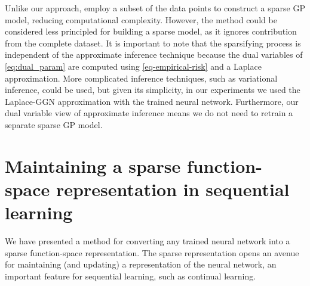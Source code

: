 \documentclass{article}
\begin{document}
Unlike our approach, \citet{immer2021improving} employ a subset of the data points to construct a sparse GP model, reducing computational complexity. However, the method could be considered less principled for building a sparse model, as it ignores contribution from the complete dataset. It is important to note that the sparsifying process is independent of the approximate inference technique because the dual variables of \cref{eq:dual_param} are computed using \cref{eq-empirical-risk} and a Laplace approximation. More complicated inference techniques, such as variational inference, could be used, but given its simplicity, in our experiments we used the Laplace-GGN approximation with the trained neural network. Furthermore, our dual variable view of approximate inference means we do not need to retrain a separate sparse GP model.%






\section{Maintaining a sparse function-space representation in sequential learning}
\label{sec:sequential}
%
We have presented a method for converting  any trained neural network into a sparse function-space representation. The sparse representation opens an avenue for maintaining (and updating) a representation of the neural network, an important feature for sequential learning, such as continual learning.
\end{document}
